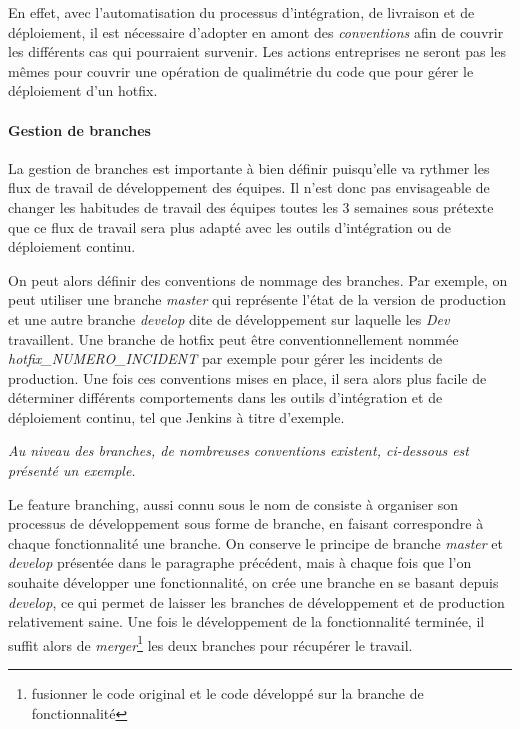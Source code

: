 En effet, avec l'automatisation du processus d'intégration, de livraison et de déploiement, il est nécessaire d'adopter en amont des \emph{conventions} afin de couvrir les différents cas qui pourraient survenir. Les actions entreprises ne seront pas les mêmes pour couvrir une opération de qualimétrie du code que pour gérer le déploiement d'un \gls{hotfix}.

\paragraph{Gestion de branches}

La gestion de branches est importante à bien définir puisqu'elle va rythmer les flux de travail de développement des équipes. Il n'est donc pas envisageable de changer les habitudes de travail des équipes toutes les 3 semaines sous prétexte que ce flux de travail sera plus adapté avec les outils d'intégration ou de déploiement continu.

On peut alors définir des conventions de nommage des branches. Par exemple, on peut utiliser une branche \emph{master} qui représente l'état de la version de production et une autre branche \emph{develop} dite de développement sur laquelle les \emph{Dev} travaillent. Une branche de \gls{hotfix} peut être conventionnellement nommée \emph{hotfix\_NUMERO\_INCIDENT} par exemple pour gérer les incidents de production. Une fois ces conventions mises en place, il sera alors plus facile de déterminer différents comportements dans les outils d'intégration et de déploiement continu, tel que Jenkins à titre d'exemple.

\emph{Au niveau des branches, de nombreuses conventions existent, ci-dessous est présenté un exemple.}

Le feature branching, aussi connu sous le nom de  consiste à organiser son processus de développement sous forme de branche, en faisant correspondre à chaque fonctionnalité une branche. On conserve le principe de branche \emph{master} et \emph{develop} présentée dans le paragraphe précédent, mais à chaque fois que l'on souhaite développer une fonctionnalité, on crée une branche en se basant depuis \emph{develop}, ce qui permet de laisser les branches de développement et de production relativement saine. Une fois le développement de la fonctionnalité terminée, il suffit alors de \emph{merger}\footnote{fusionner le code original et le code développé sur la branche de fonctionnalité} les deux branches pour récupérer le travail.

